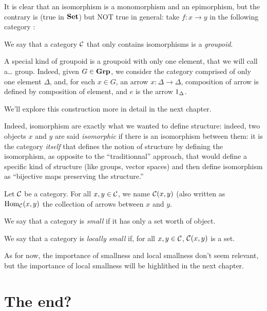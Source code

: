 \documentclass[a4paper]{article}
\DeclareMathOperator \Hom { Hom }
\theoremstyle { remark }
\theoremstyle { definition }
\newtheorem { definition } { Definition }
\theoremstyle { plain }
\begin{document}
It is clear that an isomorphism is a monomorphism and an epimorphism, but the contrary is (true in \(  \mathbf { Set }  \)) but NOT true in general: take \( f \colon x \to y \) in the following category \Two:

\begin{center}
\end{center}

We say that a category \(  \mathcal { C }  \) that only contains isomorphisms is a \emph{groupoid}.

A special kind of groupoid is a groupoid with only one element, that we will call a… group.
Indeed, given \( G \in  \mathbf { Grp }  \), we consider the category comprised of only one element \( \Delta \), and, for each \( x \in G \), an arrow \( x \colon \Delta \to \Delta \), composition of arrow is defined by composition of element, and \( e \) is the arrow \( \one[\Delta] \).

We'll explore this construction more in detail in the next chapter.

Indeed, isomorphism are exactly what we wanted to define structure: indeed, two objects \( x \) and \( y \) are said \emph{isomorphic} if there is an isomorphism between them: it is the category \emph{itself} that defines the notion of structure by defining the isomorphism, as opposite to the \enquote{traditionnal} approach, that would define a specific kind of structure (like groups, vector spaces) and then define isomorphism as \enquote{bijective maps preserving the structure.}

\begin{definition}
Let \(  \mathcal { C }  \) be a category. For all \( x, y \in  \mathcal { C }  \), we name \(  \mathcal { C } (x,y) \) (also written as \( \Hom_\C(x,y) \) the collection of arrows between \( x \) and \( y \).

We say that a category is \emph{small} if it has only a set worth of object.

We say that a category is \emph{locally small} if, for all \( x, y \in  \mathcal { C }  \), \(  \mathcal { C } (x, y) \) is a set.
\end{definition}

As for now, the importance of smallness and local smallness don't seem relevant, but the importance of local smallness will be highlithed in the next chapter.

\section{The end?}
\end{document}

